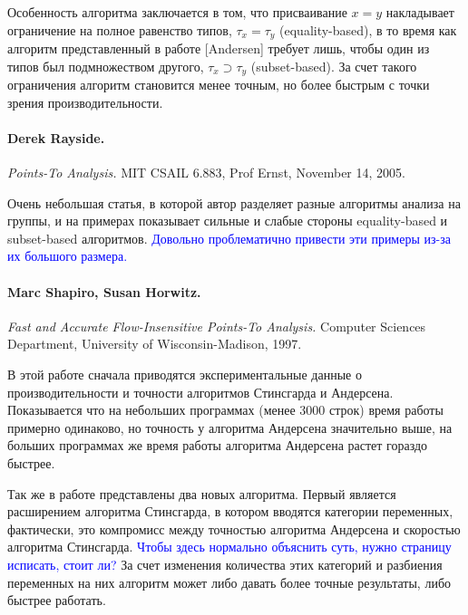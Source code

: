 \documentclass[12pt]{article}
\newcommand{\remark}[1]{\textcolor{blue}{#1}}
\newcommand{\eng}[1]{{\English#1}}
\begin{document}
      Особенность алгоритма заключается в том, что присваивание $x = y$
      накладывает ограничение на полное равенство типов,
      $\tau_x = \tau_y$ (\eng{equality-based}),
      в то время как алгоритм представленный в работе [Andersen] требует лишь,
      чтобы один из типов был подмножеством другого,
      $\tau_x \supset \tau_y$ (\eng{subset-based}).
      За счет такого ограничения алгоритм становится менее точным, но более
      быстрым с точки зрения производительности.

    \paragraph{Derek Rayside.}
      \eng{
        \textit{Points-To Analysis.}
        MIT CSAIL 6.883, Prof Ernst,
        November 14, 2005.
      }

      Очень небольшая статья, в которой автор разделяет разные алгоритмы
      анализа на группы, и на примерах показывает сильные и слабые стороны
      \eng{equality-based} и \eng{subset-based} алгоритмов.
      \remark{Довольно проблематично привести эти примеры из-за
      их большого размера.}

    \paragraph{Marc Shapiro, Susan Horwitz.}
      \eng{
        \textit{Fast and Accurate Flow-Insensitive Points-To Analysis.}
        Computer Sciences Department, University of Wisconsin-Madison,
        1997.
      }

      В этой работе сначала приводятся экспериментальные данные о
      производительности и точности алгоритмов Стинсгарда и Андерсена.
      Показывается что на небольших программах (менее 3000 строк) время работы
      примерно одинаково, но точность у алгоритма Андерсена значительно выше,
      на больших программах же время работы алгоритма Андерсена растет гораздо
      быстрее.

      Так же в работе представлены два новых алгоритма.  Первый является
      расширением алгоритма Стинсгарда, в котором вводятся категории
      переменных, фактически, это компромисс между
      точностью алгоритма Андерсена и скоростью алгоритма Стинсгарда.
      \remark{Чтобы здесь нормально объяснить суть, нужно страницу исписать,
      стоит ли?}
      За счет изменения количества этих категорий и разбиения переменных
      на них алгоритм может либо давать более точные результаты, либо быстрее
      работать.
\end{document}
